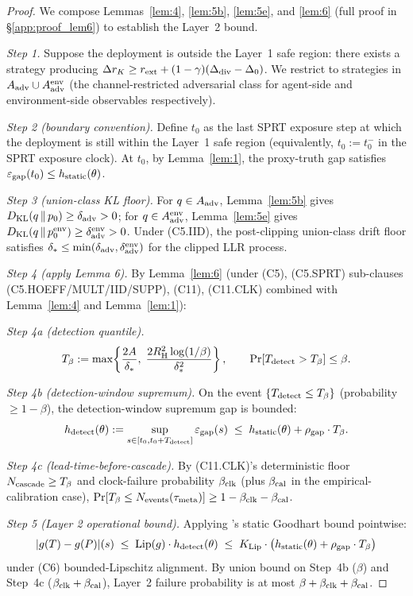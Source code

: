 \begin{proof}
We compose Lemmas~\ref{lem:4}, \ref{lem:5b}, \ref{lem:5e}, and
\ref{lem:6} (full proof in \S\ref{app:proof_lem6}) to establish the
Layer~2 bound.

\emph{Step 1.} Suppose the deployment is outside the Layer~1 safe
region: there exists a strategy producing $\Delta r_K \geq r_{\mathrm{ext}} +
(1-\gamma)(\Delta_{\mathrm{div}} - \Delta_0)$. We restrict to strategies in
$A_{\mathrm{adv}} \cup A_{\mathrm{adv}}^{\mathrm{env}}$ (the channel-restricted
adversarial class for agent-side and environment-side observables
respectively).

\emph{Step 2 (boundary convention).}  Define $t_0$ as the last
SPRT exposure step at which the deployment is still within the
Layer~1 safe region (equivalently, $t_0 := t_0^-$ in the SPRT
exposure clock).  At $t_0$, by Lemma~\ref{lem:1}, the proxy-truth
gap satisfies $\varepsilon_{\mathrm{gap}}(t_0) \leq h_{\mathrm{static}}(\theta)$.

\emph{Step 3 (union-class KL floor).} For $q \in A_{\mathrm{adv}}$,
Lemma~\ref{lem:5b} gives $D_{\mathrm{KL}}(q \,\|\, p_0) \geq
\delta_{\mathrm{adv}} > 0$; for $q \in A_{\mathrm{adv}}^{\mathrm{env}}$, Lemma~\ref{lem:5e}
gives $D_{\mathrm{KL}}(q \,\|\, p_0^{\mathrm{env}}) \geq
\delta_{\mathrm{adv}}^{\mathrm{env}} > 0$.  Under (C5.IID), the post-clipping
union-class drift floor satisfies $\delta_{*} \leq \min(\delta_{\mathrm{adv}},
\delta_{\mathrm{adv}}^{\mathrm{env}})$ for the clipped LLR process.

\emph{Step 4 (apply Lemma 6).}  By Lemma~\ref{lem:6} (under (C5),
(C5.SPRT) sub-clauses (C5.HOEFF/MULT/IID/SUPP), (C11), (C11.CLK)
combined with Lemma~\ref{lem:4} and Lemma~\ref{lem:1}):

\emph{Step 4a (detection quantile).}
\[
  T_{\beta} := \max\!\left\{\frac{2A}{\delta_{*}},\;
  \frac{2R_{\mathrm{H}}^2 \log(1/\beta)}{\delta_{*}^2}\right\},
  \qquad
  \Pr[T_{\mathrm{detect}} > T_{\beta}] \leq \beta.
\]

\emph{Step 4b (detection-window supremum).}  On the event
$\{T_{\mathrm{detect}} \leq T_{\beta}\}$ (probability $\geq 1 -
\beta$), the detection-window supremum gap is bounded:
\[
  h_{\mathrm{detect}}(\theta) := \sup_{s \in [t_0, t_0 +
  T_{\mathrm{detect}}]} \varepsilon_{\mathrm{gap}}(s) \;\leq\;
  h_{\mathrm{static}}(\theta) + \rho_{\mathrm{gap}} \cdot T_{\beta}.
\]

\emph{Step 4c (lead-time-before-cascade).}  By (C11.CLK)'s
deterministic floor $N_{\mathrm{cascade}} \geq T_{\beta}$ and clock-failure
probability $\beta_{\mathrm{clk}}$ (plus $\beta_{\mathrm{cal}}$ in the empirical-calibration
case), $\Pr[T_{\beta} \leq N_{\mathrm{events}}(\tau_{\mathrm{meta}})] \geq 1 -
\beta_{\mathrm{clk}} - \beta_{\mathrm{cal}}$.

\emph{Step 5 (Layer 2 operational bound).}  Applying
\citep[Microfoundation]{lasser2026micro}'s static Goodhart bound
pointwise:
\[
  |g(T) - g(P)|(s) \;\leq\; \mathrm{Lip}(g) \cdot
  h_{\mathrm{detect}}(\theta) \;\leq\; K_{\mathrm{Lip}} \cdot
  \bigl(h_{\mathrm{static}}(\theta) + \rho_{\mathrm{gap}} \cdot
  T_{\beta}\bigr)
\]
under (C6) bounded-Lipschitz alignment.  By union bound on Step~4b
($\beta$) and Step~4c ($\beta_{\mathrm{clk}} + \beta_{\mathrm{cal}}$), Layer~2 failure probability
is at most $\beta + \beta_{\mathrm{clk}} + \beta_{\mathrm{cal}}$.


\end{proof}

